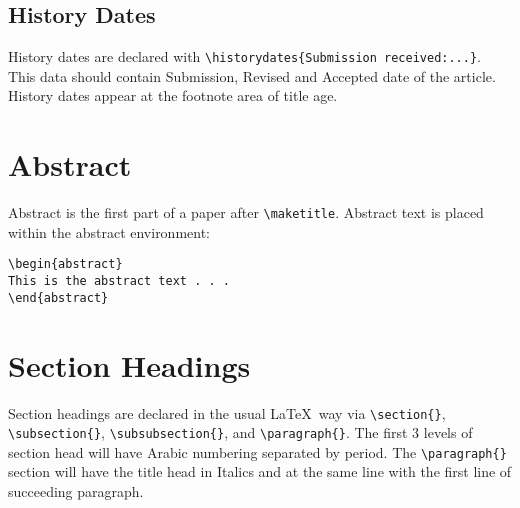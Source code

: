 \documentclass{clv3}
\begin{document}
\subsection{History Dates}

History dates are declared with \verb|\historydates{Submission received:...}|. This data
should contain Submission, Revised and Accepted date of the article. History dates appear
at the footnote area of title age.


\section{Abstract}

Abstract is the first part of a paper after \verb|\maketitle|. Abstract text is
placed within the abstract environment:

\begin{verbatim}
\begin{abstract}
This is the abstract text . . .
\end{abstract}
\end{verbatim}

\section{Section Headings}

Section headings are declared in the usual \LaTeX\ way via \verb|\section{}|,
\verb|\subsection{}|, \verb|\subsubsection{}|, and \verb|\paragraph{}|. The
first 3 levels of section head will have Arabic numbering separated
by period. The \verb|\paragraph{}| section will have the title head in Italics
and at the same line with the first line of succeeding paragraph.
\end{document}

